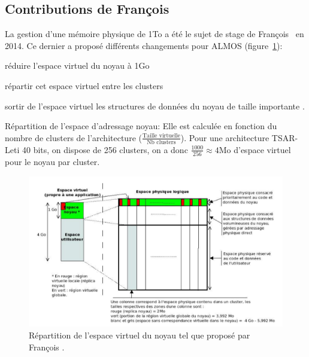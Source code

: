       
    \subsection{Contributions de François~\citeauthor{guerret2014exploitation}}
      
      La gestion d'une mémoire physique de 1To a été le sujet de stage de
      François~\citet{guerret2014exploitation} en 2014. Ce dernier a proposé
      différents changements pour ALMOS (figure~\ref{fig:almos-guerret}):
      \benumline \item réduire l'espace virtuel du noyau à 1Go \item répartir
      cet espace virtuel entre les clusters \item sortir de l'espace virtuel les
      structures de données du noyau de taille importante \eenumline.

      \begin{paragraph}{Répartition de l'espace d'adressage noyau:}
        Elle est calculée en fonction du nombre de clusters de l'architecture
        ($\frac{\text{Taille virtuelle}}{\text{Nb clusters}}$). Pour une
        architecture TSAR-Leti 40 bits, on dispose de 256 clusters, on a donc
        $\frac{1000}{256}\approx4$Mo d'espace virtuel pour le noyau par cluster.
      \end{paragraph}

      \begin{figure}[ht]
        \centering \includegraphics[scale=0.8]{include/img/almos-guerret}
        \caption{Répartition de l'espace virtuel du noyau tel que proposé par
          François \citet{guerret2014exploitation}.}
        \label{fig:almos-guerret}
      \end{figure}

